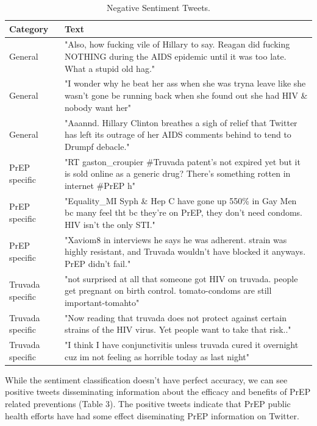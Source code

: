 \documentclass{sig-alternate-05-2015}
\begin{document}
\begin{table}
\centering
\caption{Negative Sentiment Tweets.}
\begin{tabular}{|p{2.5cm}|p{12cm}|} \hline
Category & Text\\ \hline
General & "Also, how fucking vile of Hillary to say. Reagan did fucking NOTHING during the AIDS epidemic until it was too late. What a stupid old hag."\\ \hline
General & "I wonder why he beat her ass when she was tryna leave like she wasn't gone be running back when she found out she had HIV \& nobody want her"\\ \hline
General & "Aaannd. Hillary Clinton breathes a sigh of relief that Twitter has left its outrage of her AIDS comments behind to tend to Drumpf debacle."\\ \hline

PrEP specific & "RT gaston\_croupier \#Truvada patent's not expired yet but it is sold online as a generic drug? There's something rotten in internet \#PrEP h"\\ \hline
PrEP specific & "Equality\_MI Syph \& Hep C have gone up 550\% in Gay Men bc many feel tht bc they're on PrEP, they don't need condoms. HIV isn't the only STI."\\ \hline
PrEP specific & "Xaviom8 in interviews he says he was adherent. strain was highly resistant, and Truvada wouldn't have blocked it anyways. PrEP didn't fail."\\ \hline

Truvada specific & "not surprised at all that someone got HIV on truvada. people get pregnant on birth control. tomato-condoms are still important-tomahto"\\ \hline
Truvada specific & "Now reading that truvada does not protect against certain strains of the HIV virus. Yet people want to take that risk.."\\ \hline
Truvada specific & "I think I have conjunctivitis unless truvada cured it overnight cuz im not feeling as horrible today as last night"\\ \hline

\hline\end{tabular}
\end{table}

While the sentiment classification doesn't have perfect accuracy, we can see positive tweets disseminating information about the efficacy and benefits of PrEP related preventions (Table 3). The positive tweets indicate that PrEP public health efforts have had some effect diseminating PrEP information on Twitter. 
\end{document}
